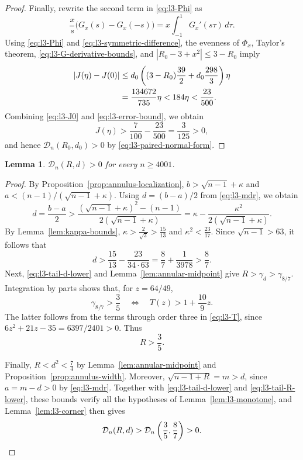 \documentclass[11pt]{article}
\numberwithin{equation}{section}
\newtheorem{lemma}[theorem]{Lemma}
\theoremstyle{definition}
\begin{document}
\begin{proof}
Finally, rewrite the second term in \eqref{eq:l3-Phi} as
\begin{equation}\label{eq:l3-symmetric-difference}
 \frac{x}{s}\bigl(G_x(s)-G_x(-s)\bigr)
 =x\int_{-1}^1G_x'(s\tau)\,d\tau.
\end{equation}
Using \eqref{eq:l3-Phi} and \eqref{eq:l3-symmetric-difference}, the evenness
of $\Phi_x$, Taylor's theorem, \eqref{eq:l3-G-derivative-bounds}, and
$|R_0-3+x^2|\leq3-R_0$ imply
\begin{align}
 |J(\eta)-J(0)|
 &\leq d_0\left((3-R_0)\frac{39}{2}
 +d_0\frac{298}{3}\right)\eta\notag\\
 &=\frac{134672}{735}\eta<184\eta<\frac{23}{500}.
 \label{eq:l3-error-bound}
\end{align}
Combining \eqref{eq:l3-J0} and \eqref{eq:l3-error-bound}, we obtain
\[
    J(\eta)>\frac7{100}-\frac{23}{500}
    =\frac3{125}>0,
\]
and hence $\mathcal D_n(R_0,d_0)>0$ by
\eqref{eq:l3-paired-normal-form}.
\end{proof}

\begin{lemma}\label{lem:l3-tail}
$\mathcal D_n(R,d)>0$ for every $n\geq4001$.
\end{lemma}

\begin{proof}
By Proposition~\ref{prop:annulus-localization}, $b>\sqrt{n-1}+\kappa$ and
$a<(n-1)/(\sqrt{n-1}+\kappa)$. Using $d=(b-a)/2$ from
\eqref{eq:l3-mdr}, we obtain
\[
    d=\frac{b-a}2>\frac{(\sqrt{n-1}+\kappa)^2-(n-1)}{2(\sqrt{n-1}+\kappa)}
    =\kappa-\frac{\kappa^2}{2(\sqrt{n-1}+\kappa)}.
\]
By Lemma~\ref{lem:kappa-bounds},
$\kappa>\frac2{\sqrt3}>\frac{15}{13}$ and
$\kappa^2<\frac{23}{17}$. Since $\sqrt{n-1}>63$, it follows that
\begin{equation}\label{eq:l3-tail-d-lower}
    d>\frac{15}{13}-\frac{23}{34\cdot63}
    =\frac87+\frac1{3978}>\frac87.
\end{equation}
Next, \eqref{eq:l3-tail-d-lower} and Lemma~\ref{lem:annular-midpoint} give
$R>\gamma_d>\gamma_{8/7}$. Integration by parts shows that, for
$z=64/49$,
\[
    \gamma_{8/7}>\frac35
    \quad\Longleftrightarrow\quad
    T(z)>1+\frac{10}{9}z.
\]
The latter follows from the terms through order three in \eqref{eq:l3-T},
since $6z^2+21z-35=6397/2401>0$. Thus
\begin{equation}\label{eq:l3-tail-R-lower}
    R>\frac35.
\end{equation}

Finally, $R<d^2<\frac74$ by Lemma~\ref{lem:annular-midpoint} and
Proposition~\ref{prop:annulus-width}. Moreover,
$\sqrt{n-1+R}=m>d$, since $a=m-d>0$ by \eqref{eq:l3-mdr}.
Together with \eqref{eq:l3-tail-d-lower} and \eqref{eq:l3-tail-R-lower},
these bounds verify all the hypotheses of Lemma~\ref{lem:l3-monotone}, and
Lemma~\ref{lem:l3-corner} then gives
\[
    \mathcal D_n(R,d)
    >\mathcal D_n\left(\frac35,\frac87\right)>0. \qedhere
\]
\end{proof}
\end{document}
